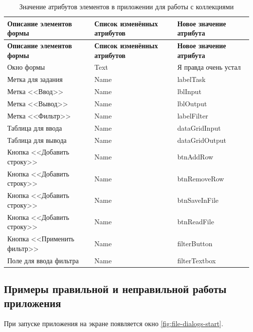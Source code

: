 \begin{xltabular}{\textwidth}{| m{0.3\textwidth} | m{0.3\textwidth} | m{0.3\textwidth} |}

\hline
\textbf{Описание элементов формы} & \textbf{Список изменённых атрибутов} & \textbf{Новое значение атрибута} \\
\hline
\endfirsthead

\hline
\textbf{Описание элементов формы} & \textbf{Список изменённых атрибутов} & \textbf{Новое значение атрибута} \\
\hline
\endhead

\hline
\endfoot

\hline
\caption{Значение атрибутов элементов в приложении для работы с коллекциями}
\label{tab:file-dialogs-form}
\endlastfoot

Окно формы & Text & Я правда очень устал \\

Метка для задания & Name & labelTask \\
Метка <<Ввод>> & Name & lblInput \\
Метка <<Вывод>> & Name & lblOutput \\
Метка <<Фильтр>> & Name & labelFilter \\

Таблица для ввода & Name & dataGridInput \\
Таблица для вывода & Name & dataGridOutput \\

Кнопка <<Добавить строку>> & Name & btnAddRow \\
Кнопка <<Добавить строку>> & Name & btnRemoveRow \\
Кнопка <<Добавить строку>> & Name & btnSaveInFile \\
Кнопка <<Добавить строку>> & Name & btnReadFile \\
Кнопка <<Применить фильтр>> & Name & filterButton \\

Поле для ввода фильтра & Name & filterTextbox \\
\end{xltabular}


\subsection{Примеры правильной и неправильной работы приложения}
При запуске приложения на экране появляется окно \ref{fig:file-dialogs-start}.

